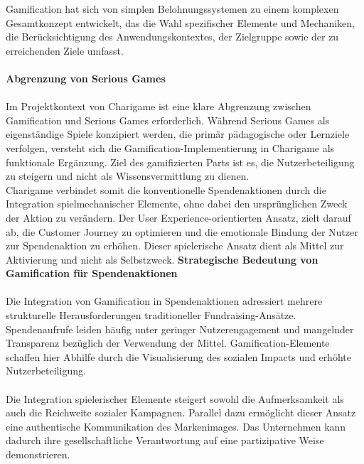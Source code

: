 Gamification hat sich von simplen Belohnungssystemen zu einem komplexen Gesamtkonzept entwickelt, das die Wahl spezifischer Elemente und Mechaniken, die Berücksichtigung des Anwendungskontextes, der Zielgruppe sowie der zu erreichenden Ziele umfasst.\cite{bpb2023gamification}
\\\\
\textbf{Abgrenzung von Serious Games}\\\\
Im Projektkontext von Charigame ist eine klare Abgrenzung zwischen Gamification und Serious Games erforderlich.
Während Serious Games als eigenständige Spiele konzipiert werden, die primär pädagogische oder Lernziele verfolgen, versteht sich die Gamification-Implementierung in Charigame als funktionale Ergänzung.
Ziel des gamifizierten Parts ist es, die Nutzerbeteiligung zu steigern und nicht als Wissensvermittlung zu dienen.
\\
Charigame verbindet somit die konventionelle Spendenaktionen durch die Integration spielmechanischer Elemente, ohne dabei den ursprünglichen Zweck der Aktion zu verändern.
Der User Experience-orientierten Ansatz, zielt darauf ab, die Customer Journey zu optimieren und die emotionale Bindung der Nutzer zur Spendenaktion zu erhöhen.
Dieser spielerische Ansatz dient als Mittel zur Aktivierung und nicht als Selbstzweck.
\newpage
\textbf{Strategische Bedeutung von Gamification für Spendenaktionen}
\\\\
Die Integration von Gamification in Spendenaktionen adressiert mehrere strukturelle Herausforderungen traditioneller Fundraising-Ansätze.
Spendenaufrufe leiden häufig unter geringer Nutzerengagement und mangelnder Transparenz bezüglich der Verwendung der Mittel.
Gamification-Elemente schaffen hier Abhilfe durch die Visualisierung des sozialen Impacts und erhöhte Nutzerbeteiligung\cite{golrang2021applying}.
\\\\
Die Integration spielerischer Elemente steigert sowohl die Aufmerksamkeit als auch die Reichweite sozialer Kampagnen.
Parallel dazu ermöglicht dieser Ansatz eine authentische Kommunikation des Markenimages.
Das Unternehmen kann dadurch ihre gesellschaftliche Verantwortung auf eine partizipative Weise demonstrieren.
